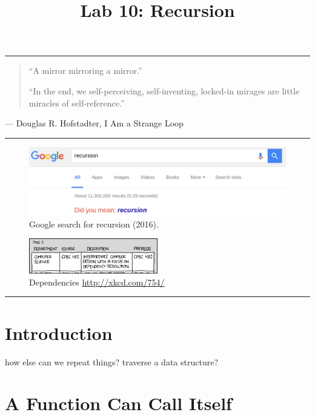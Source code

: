 \documentclass[11pt]{cselabheader}
\title{Lab 10: Recursion}
\begin{document}
\maketitle
{}
\hrule

\begin{quote}
``A mirror mirroring a mirror.''

``In the end, we self-perceiving, self-inventing, locked-in mirages
are little miracles of self-reference.''
\end{quote}
\begin{flushright}
--- Douglas R. Hofstadter, I Am a Strange Loop
\end{flushright}

\hrule

\begin{figure}[H]
  \centering
  \includegraphics[width=\textwidth]{img/didyoumean.png}
  \caption{Google search for recursion (2016).}
\end{figure}

\begin{figure}[H]
  \centering
  \includegraphics[width=0.5\textwidth]{img/xkcd_dependencies.png}
  \caption{Dependencies \url{http://xkcd.com/754/}}
\end{figure}

\hrule

\pagebreak
\tableofcontents

\section*{Introduction}

\pagebreak
{}

how else can we repeat things? traverse a data structure?

\section{A Function Can Call Itself}
\end{document}

